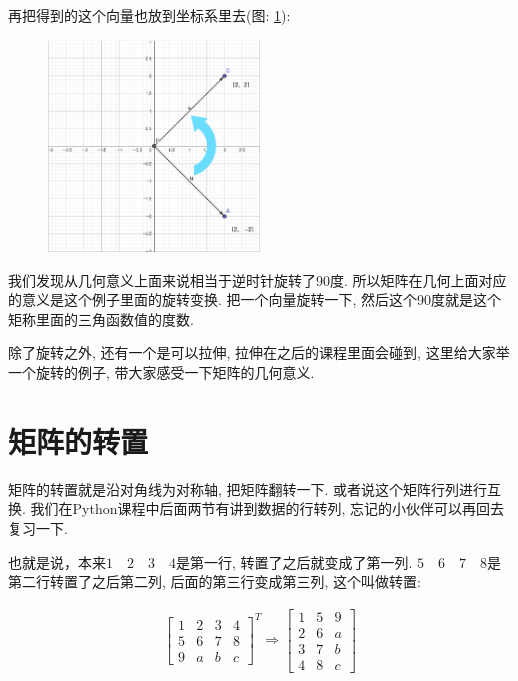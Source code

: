 再把得到的这个向量也放到坐标系里去(图: \ref{fig:img4_2}):

\begin{figure}[ht]
  \centering
  \caption{}
  \label{fig:img4_2}
  \includegraphics[width=0.5\textwidth]{asset/20230825225602.png}
\end{figure}

我们发现从几何意义上面来说相当于逆时针旋转了90度. 所以矩阵在几何上面对应的意义是这个例子里面的旋转变换. 把一个向量旋转一下, 然后这个90度就是这个矩称里面的三角函数值的度数. 

除了旋转之外, 还有一个是可以拉伸, 拉伸在之后的课程里面会碰到, 这里给大家举一个旋转的例子, 带大家感受一下矩阵的几何意义. 

\section{矩阵的转置}

矩阵的转置就是沿对角线为对称轴, 把矩阵翻转一下. 或者说这个矩阵行列进行互换. 我们在Python课程中后面两节有讲到数据的行转列, 忘记的小伙伴可以再回去复习一下. 

也就是说，本来$1 \quad 2 \quad 3 \quad 4$是第一行, 转置了之后就变成了第一列. $5 \quad 6 \quad 7 \quad 8$是第二行转置了之后第二列, 后面的第三行变成第三列, 这个叫做转置:

\begin{align*}
  \begin{bmatrix} 1 & 2 & 3 & 4 \\ 5 & 6 & 7 & 8 \\ 9 & a & b & c \end{bmatrix}^T
  \Rightarrow \begin{bmatrix} 1 & 5 & 9 \\ 2 & 6 & a \\ 3 & 7 & b \\ 4 & 8 & c \end{bmatrix}
\end{align*}

